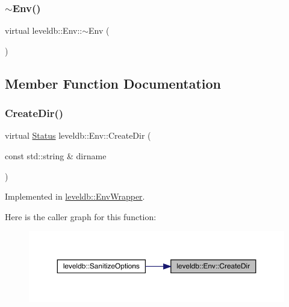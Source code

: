 \subsubsection{\texorpdfstring{$\sim$Env()}{~Env()}}
{\footnotesize\ttfamily virtual leveldb\+::\+Env\+::$\sim$\+Env (\begin{DoxyParamCaption}{ }\end{DoxyParamCaption})\hspace{0.3cm}{\ttfamily [virtual]}}



\subsection{Member Function Documentation}
\mbox{\label{classleveldb_1_1_env_ae6b7c8122df5a8020b2a3439ac39646e}} 
\subsubsection{\texorpdfstring{CreateDir()}{CreateDir()}}
{\footnotesize\ttfamily virtual \mbox{\hyperlink{classleveldb_1_1_status}{Status}} leveldb\+::\+Env\+::\+Create\+Dir (\begin{DoxyParamCaption}\item[{const std\+::string \&}]{dirname }\end{DoxyParamCaption})\hspace{0.3cm}{\ttfamily [pure virtual]}}



Implemented in \mbox{\hyperlink{classleveldb_1_1_env_wrapper_a33a6d66b4d8791828e8b4e36ae3948a3}{leveldb\+::\+Env\+Wrapper}}.

Here is the caller graph for this function\+:
\nopagebreak
\begin{figure}[H]
\begin{center}
\leavevmode
\includegraphics[width=350pt]{classleveldb_1_1_env_ae6b7c8122df5a8020b2a3439ac39646e_icgraph}
\end{center}
\end{figure}
\mbox{\label{classleveldb_1_1_env_ab25f3129d5bc63cf3418d362e0e35912}} 
